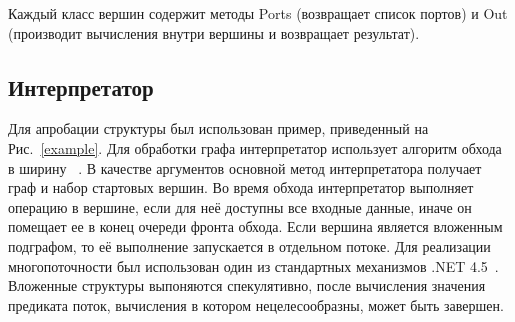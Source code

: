 \documentclass{matmex-diploma-custom}
\begin{document}
Каждый класс вершин содержит методы Ports (возвращает список портов) и Out (производит вычисления внутри вершины и возвращает результат). 

\subsection{Интерпретатор}
Для апробации структуры был использован пример, приведенный на Рис.~\ref{example}. Для обработки графа интерпретатор использует алгоритм обхода в ширину ~\cite{bfs}. В качестве аргументов основной метод интерпретатора получает граф и набор стартовых вершин. Во время обхода интерпретатор выполняет операцию в вершине, если для неё доступны все входные данные, иначе он помещает ее в конец очереди фронта обхода. Если вершина является вложенным подграфом, то её выполнение запускается в отдельном потоке. Для реализации многопоточности был использован один из стандартных механизмов .NET 4.5~\cite{task}. Вложенные структуры выпоняются спекулятивно, после вычисления значения предиката поток, вычисления в котором нецелесообразны, может быть завершен.
\end{document}

